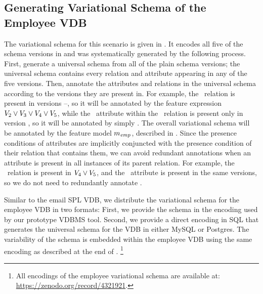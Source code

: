 \subsection{Generating Variational Schema of the Employee VDB}
\label{sec:emp-vsch}



The variational schema for this scenario is given in . It
encodes all five of the schema versions in  and was
systematically generated by the following process. First, generate a universal
schema from all of the plain schema versions; the universal schema contains
every relation and attribute appearing in any of the five versions. Then,
annotate the attributes and relations in the universal schema according to the
versions they are present in.
%
For example, the \empacct\ relation is present in versions \vTwo--\vFive, so it
will be annotated by the feature expression
$\vTwo\vee\vThree\vee\vFour\vee\vFive$, while the \salary\ attribute within the
\empacct\ relation is present only in version \vFive, so it will be annotated
by simply \vFive.
%
 The overall variational schema will be annotated by the feature model
 $\fModel_\employee$, described in .
%
Since the presence conditions of attributes are implicitly conjuncted with the
presence condition of their relation
 that contains them, 
 we can avoid redundant
annotations when an attribute is present in all instances of its parent
relation. For example, the \empbio\ relation is present in $\vFour\vee\vFive$,
and the \birthdate\ attribute is present in the same versions, so we do not
need to redundantly annotate 
 \birthdate.

Similar to the email SPL VDB, we distribute the variational schema for the
employee VDB in two formats:
%
First, we provide the schema in the encoding used by our prototype VDBMS tool.%
%
Second, we provide a direct encoding in SQL that generates the universal schema
for the VDB in either MySQL or Postgres.%
%
The variability of the schema is embedded within the employee VDB%
%
using the same encoding as described at the end of .%
\footnote{All encodings of the employee variational schema are available at: \url{https://zenodo.org/record/4321921}.} 

